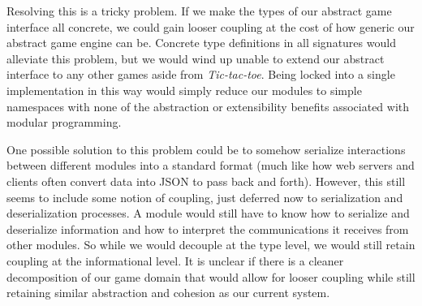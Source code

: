 \documentclass[9pt,letterpaper]{extarticle}
\begin{document}
  Resolving this is a tricky problem. If we make the types of our abstract game interface all concrete,
  we could gain looser coupling at the cost of how generic our abstract game engine can be. Concrete
  type definitions in all signatures would alleviate this problem, but we would wind up unable to extend
  our abstract interface to any other games aside from \textit{Tic-tac-toe}. Being locked into a single
  implementation in this way would simply reduce our modules to simple namespaces with none of the 
  abstraction or extensibility benefits associated with modular programming.
  
  One possible solution to this problem could be to somehow serialize interactions between
  different modules into a standard format (much like how web servers and clients often convert data
  into JSON to pass back and forth). However, this still seems to include some notion of coupling, just
  deferred now to serialization and deserialization processes. A module would still have to know how to
  serialize and deserialize information and how to interpret the communications it receives from 
  other modules. So while we would decouple at the type level, we would still retain coupling at the
  informational level. It is unclear if there is a cleaner decomposition of our game domain that would
  allow for looser coupling while still retaining similar abstraction and cohesion as our current system.
\end{document}
